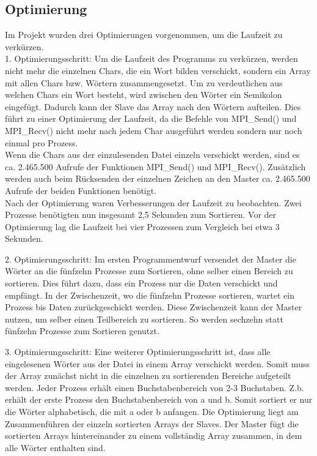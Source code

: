 \subsection{Optimierung}
Im Projekt wurden drei Optimierungen vorgenommen, um die Laufzeit zu verkürzen.\\

1. Optimierungsschritt: Um die Laufzeit des Programms zu verkürzen, werden nicht mehr die einzelnen Chars, die ein Wort bilden verschickt, sondern ein Array  mit allen Chars bzw. Wörtern zusammengesetzt. Um zu verdeutlichen aus welchen Chars ein Wort besteht, wird zwischen den Wörter ein Semikolon eingefügt. Dadurch kann der Slave das Array nach den Wörtern aufteilen. Dies führt zu einer Optimierung der Laufzeit, da die Befehle von MPI\_Send() und MPI\_Recv() nicht mehr nach jedem Char ausgeführt werden sondern nur noch einmal pro Prozess. \\
Wenn die Chars aus der einzulesenden Datei einzeln verschickt werden, sind es ca. 2.465.500 Aufrufe der Funktionen MPI\_Send() und MPI\_Recv(). Zusätzlich werden auch beim Rücksenden der einzelnen Zeichen an den Master ca. 2.465.500 Aufrufe der beiden Funktionen benötigt.\\
Nach der Optimierung waren Verbesserungen der Laufzeit zu beobachten. Zwei Prozesse benötigten nun insgesamt 2,5 Sekunden zum Sortieren. Vor der Optimierung lag die Laufzeit bei vier Prozessen zum Vergleich bei etwa 3 Sekunden.  

2. Optimierungsschritt: Im ersten Programmentwurf versendet der Master die Wörter an die fünfzehn Prozesse zum Sortieren, ohne selber einen Bereich zu sortieren. Dies führt dazu, dass ein Prozess nur die Daten verschickt und empfängt. In der Zwischenzeit, wo die fünfzehn Prozesse sortieren, wartet ein Prozess bis Daten zurückgeschickt werden. Diese Zwischenzeit kann der Master nutzen, um selber einen Teilbereich zu sortieren. So werden sechzehn statt fünfzehn Prozesse zum Sortieren genutzt.  

3. Optimierungsschritt: Eine weiterer Optimierungsschritt ist, dass alle eingelesenen Wörter aus der Datei in einem Array verschickt werden. Somit muss der Array zunächst nicht in die einzelnen zu sortierenden Bereiche aufgeteilt werden. Jeder Prozess erhält einen Buchstabenbereich von 2-3 Buchstaben. Z.b. erhält der erste Prozess den Buchstabenbereich von a und b. Somit sortiert er nur die Wörter alphabetisch, die mit a oder b anfangen. Die Optimierung liegt am Zusammenführen der einzeln sortierten Arrays der Slaves. Der Master fügt die sortierten Arrays hintereinander zu einem vollständig Array zusammen, in dem alle Wörter enthalten sind. \\